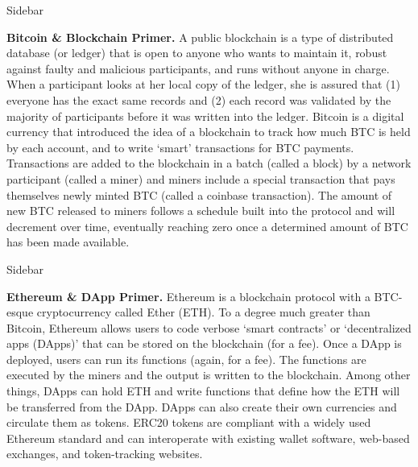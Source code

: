 
\begin{Sidebar*}[h!]
\begin{framed}
Sidebar
\begin{flushleft}
\textbf{Bitcoin \& Blockchain Primer.} A public blockchain is a type of distributed database (or ledger) that is open to anyone who wants to maintain it, robust against faulty and malicious participants, and runs without anyone in charge. When a participant looks at her local copy of the ledger, she is assured that (1) everyone has the exact same records and (2) each record was validated by the majority of participants before it was written into the ledger. Bitcoin is a digital currency that introduced the idea of a blockchain to track how much BTC is held by each account, and to write `smart' transactions for BTC payments. Transactions are added to the blockchain in a batch (called a block) by a network participant (called a miner) and miners include a special transaction that pays themselves newly minted BTC (called a coinbase transaction). The amount of new BTC released to miners follows a schedule built into the protocol and will decrement over time, eventually reaching zero once a determined amount of BTC has been made available. 
\end{flushleft}
\end{framed}
\end{Sidebar*}


\begin{Sidebar*}[h!]
\begin{framed}
Sidebar
\begin{flushleft}
\textbf{Ethereum \& DApp Primer.} Ethereum is a blockchain protocol with a BTC-esque cryptocurrency called Ether (ETH). To a degree much greater than Bitcoin, Ethereum allows users to code verbose `smart contracts' or `decentralized apps (DApps)' that can be stored on the blockchain (for a fee). Once a DApp is deployed, users can run its functions (again, for a fee). The functions are executed by the miners and the output is written to the blockchain. Among other things, DApps can hold ETH and write functions that define how the ETH will be transferred from the DApp. DApps can also create their own currencies and circulate them as tokens. ERC20 tokens are compliant with a widely used Ethereum standard and can interoperate with existing wallet software, web-based exchanges, and token-tracking websites.
\end{flushleft}
\end{framed}
\end{Sidebar*}

